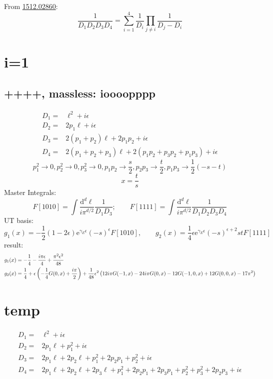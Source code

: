 \documentclass{article}
\title{}
\author{}
\date{}
\numberwithin{equation}{section}
\newcommand{\dd}{\mathrm{d}}
\newcommand{\ee}{\mathrm{e}}
\begin{document}
From \href{https://arxiv.org/pdf/1512.02860.pdf}{1512.02860}: 
\begin{equation}
	\frac{1}{D_1D_2D_3D_4}=\sum_{i=1}^{4}\frac{1}{D_i}\prod_{j\ne i}\frac{1}{D_j-D_i}
\end{equation}
\section{i=1}
\subsection{ ++++, massless: ioooopppp}


	\begin{align}
	D_1=&\ell ^2+i \epsilon  \\
	D_2=&2 p_1 \ell +i \epsilon  \\
	D_3=&2 \left(p_1+p_2\right) \ell +2 p_1 p_2+i \epsilon  \\
	D_4=&2 \left(p_1+p_2+p_3\right) \ell +2 \left(p_1 p_2+p_3 p_2+p_1 p_3\right)+i \epsilon  
	\end{align}
\begin{equation}
	p_1^2\to 0,p_2^2\to 0,p_3^2\to 0,p_1 p_2\to \frac{s}{2},p_2 p_3\to \frac{t}{2},p_1 p_3\to
	\frac{1}{2} (-s-t)
\end{equation}
\begin{equation}
	x=\frac{t}{s}
\end{equation}
Master Integrals:
\begin{equation}
	F[1010]=\int\frac{\dd^d\ell}{i\pi^{d/2}}\frac{1}{D_1D_3};\qquad F[1111]=\int\frac{\dd^d\ell}{i\pi^{d/2}}\frac{1}{D_1D_2D_3D_4}
\end{equation}
UT basis:
\begin{equation}
	g_1(x)=-\frac12(1-2\epsilon)\ee^{\gamma_E\epsilon}(-s)^{\epsilon}F[1010],\qquad g_2(x)=\frac14\epsilon\ee^{\gamma_E\epsilon}(-s)^{\epsilon+2}s tF[1111]
\end{equation}
result:
\begin{align}
	&g_1(x)=-\frac{1}{4}-\frac{i \pi  \epsilon }{4}+\frac{\pi ^2 \epsilon ^2}{48}\\
	&g_2(x)=\frac{1}{4}+\epsilon  \left(-\frac{1}{4} G(0,x)+\frac{i \pi }{2}\right)
	+\frac{1}{48} \epsilon ^2 \left(12 i \pi  G(-1,x)-24 i \pi  G(0,x)-12 G(-1,0,x)+12 G(0,0,x)-17 \pi ^2\right)\notag
\end{align}
\section{temp}
\begin{align}
D_1=&\ell ^2+i \epsilon \\
D_2=&2 p_1 \ell +p_1^2+i \epsilon \\
D_3=&2 p_1 \ell +2 p_2 \ell +p_1^2+2 p_2 p_1+p_2^2+i \epsilon \\
D_4=&2 p_1 \ell +2 p_2 \ell +2 p_3 \ell +p_1^2+2 p_2 p_1+2 p_3 p_1+p_2^2+p_3^2+2 p_2 p_3+i \epsilon 
\end{align}

	
\end{document}
